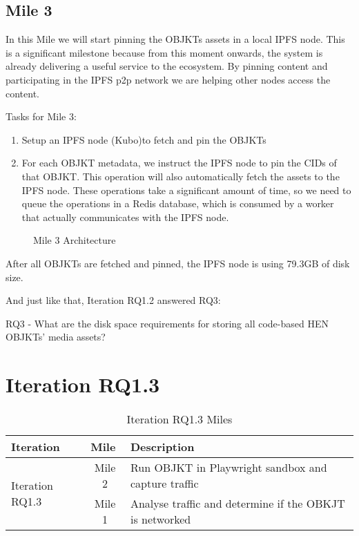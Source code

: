 \subsection {Mile 3}

In this Mile we will start pinning the OBJKTs assets in a local IPFS node. This is a significant milestone because from this moment onwards, the system is already delivering a useful service to the ecosystem. By pinning content and participating in the IPFS p2p network we are helping other nodes access the content.

Tasks for Mile 3:
\begin{enumerate}
	\item Setup an IPFS node (Kubo)\footnotemark[8] to fetch and pin the OBJKTs
	\item For each OBJKT metadata, we instruct the IPFS node to pin the CIDs of that OBJKT. This operation will also automatically fetch the assets to the IPFS node. These operations take a significant amount of time, so we need to queue the operations in a Redis database, which is consumed by a worker that actually communicates with the IPFS node.
\end{enumerate}




\begin{figure}[h]
    \centering
    
    \caption[Mile 3 Architecture]{Mile 3 Architecture}
    \label{fig:mile3-arch}
\end{figure}


After all OBJKTs are fetched and pinned, the IPFS node is using 79.3GB of disk size.

\label{txt:rq3-answered}
And just like that, Iteration RQ1.2 answered RQ3:

\vspace{0.5cm}
RQ3 - What are the disk space requirements for storing all code-based HEN OBJKTs’ media assets?
\vspace{0.5cm}

\section {Iteration RQ1.3}


\begin{table}[h]
\footnotesize
\centering
\begin{tabular}{|l|c|l|}
\hline
\textbf{Iteration}        & \multicolumn{1}{l|}{\textbf{Mile}} & \textbf{Description}                                         \\ \hline
\multirow{2}{*}{Iteration RQ1.3} & Mile 2                              & Run OBJKT in Playwright sandbox and capture traffic          \\ \cline{2-3} 
                             & Mile 1                              & Analyse traffic and determine if the OBKJT is networked      \\ \hline
\end{tabular}
\caption{Iteration RQ1.3 Miles}
\end{table}



